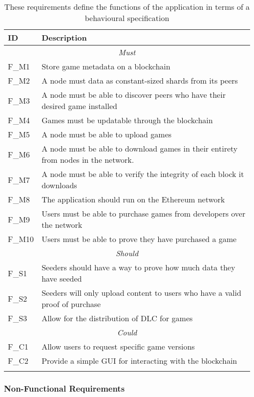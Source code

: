 \begin{longtable}{ p{} p{} }
  \toprule
  \textbf{ID} & \textbf{Description}
  \\\midrule\midrule
  \multicolumn{2}{c}{\cellcolor{red!70}\textit{Must}}\\\midrule
  F\_M1 & Store game metadata on a blockchain\\
  F\_M2 & A node must data as constant-sized shards from its peers\\
  F\_M3 & A node must be able to discover peers who have their desired game installed\\
  F\_M4 & Games must be updatable through the blockchain\\
  F\_M5 & A node must be able to upload games\\
  F\_M6 & A node must be able to download games in their entirety from nodes in the network.\\
  F\_M7 & A node must be able to verify the integrity of each block it downloads\\
  F\_M8 & The application should run on the Ethereum network\\
  F\_M9 & Users must be able to purchase games from developers over the network\\
  F\_M10 & Users must be able to prove they have purchased a game\\
  \midrule\multicolumn{2}{c}{\cellcolor{orange!70}\textit{Should}}\\\midrule
  F\_S1 & Seeders should have a way to prove how much data they have seeded\\
  F\_S2 & Seeders will only upload content to users who have a valid proof of purchase\\
  F\_S3 & Allow for the distribution of DLC for games\\
  \midrule\multicolumn{2}{c}{\cellcolor{green}\textit{Could}}\\\midrule
  F\_C1 & Allow users to request specific game versions\\
  F\_C2 & Provide a simple GUI for interacting with the blockchain\\
  \midrule
  \bottomrule
  \caption{These requirements define the functions of the application in terms of a behavioural specification }
  \label{tab:functional-requirements}
\end{longtable}

\subsubsection*{Non-Functional Requirements}

